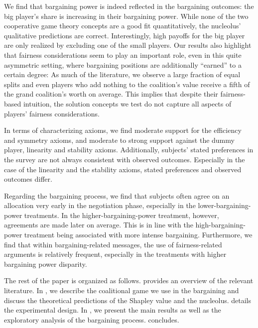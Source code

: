 



We find that bargaining power is indeed reflected in the bargaining outcomes: the big player's share is increasing in their bargaining power. While none of the two cooperative game theory concepts are a good fit quantitatively, the nucleolus' qualitative predictions are correct. Interestingly, high payoffs for the big player are only realized by excluding one of the small players. Our results also highlight that fairness considerations seem to play an important role, even in this quite asymmetric setting, where bargaining positions are additionally ``earned'' to a certain degree: As much of the literature, we observe a large fraction of equal splits and even players who add nothing to the coalition's value receive a fifth of the grand coalition's worth on average. This implies that despite their fairness-based intuition, the solution concepts we test do not capture all aspects of players' fairness considerations.

In terms of characterizing axioms, we find moderate support for the efficiency and symmetry axioms, and moderate to strong support against the dummy player, linearity and stability axioms. Additionally, subjects' stated preferences in the survey are not always consistent with observed outcomes. Especially in the case of the linearity and the stability axioms, stated preferences and observed outcomes differ.


Regarding the bargaining process, we find that subjects often agree on an allocation very early in the negotiation phase, especially in the lower-bargaining-power treatments. In the higher-bargaining-power treatment, however, agreements are made later on average. This is in line with the high-bargaining-power treatment being associated with more intense bargaining. Furthermore, we find that within bargaining-related messages, the use of fairness-related arguments is relatively frequent, especially in the treatments with higher bargaining power disparity. 


The rest of the paper is organized as follows.  provides an overview of the relevant literature. In , we describe the coalitional game we use in the bargaining and discuss the theoretical predictions of the Shapley value and the nucleolus.  details the experimental design. In , we present the main results as well as the exploratory analysis of the bargaining process.  concludes.


